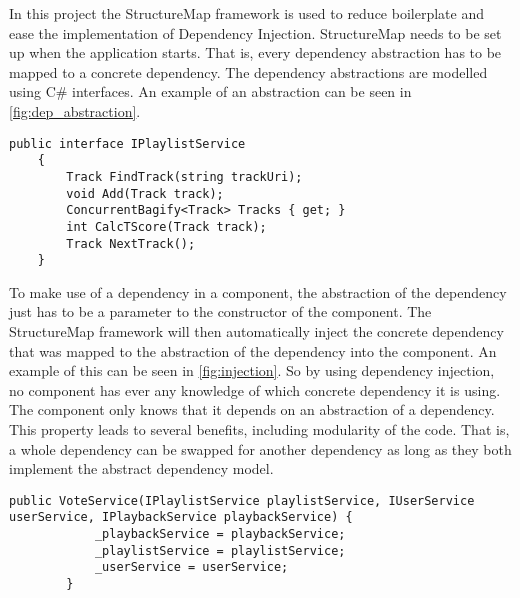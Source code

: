 In this project the StructureMap framework is used to reduce
boilerplate and ease the implementation of Dependency
Injection. StructureMap needs to be set up when the application
starts. That is, every dependency abstraction has to be mapped to a
concrete dependency. The dependency abstractions are modelled using
C\# interfaces. An example of an abstraction can be seen in \cref{fig:dep_abstraction}.

\begin{lstlisting}[caption = {Abstraction of a dependency abstraction
    using C\# interfaces. A concrete dependency has to implement the
    methods described in the abstraction.}, label={fig:dep_abstraction}]
public interface IPlaylistService
    {
        Track FindTrack(string trackUri);
        void Add(Track track);
        ConcurrentBagify<Track> Tracks { get; }
        int CalcTScore(Track track);
        Track NextTrack();
    }
\end{lstlisting}

To make use of a dependency in a component, the abstraction of the
dependency just has to be a parameter to the constructor of the
component. The StructureMap framework will then automatically inject
the concrete dependency that was mapped to the abstraction of the
dependency into the component. An example of this can be seen in
\cref{fig:injection}. So by using dependency injection, no component
has ever any knowledge of which concrete dependency it is using. The
component only knows that it depends on an abstraction of a
dependency. This property leads to several benefits, including
modularity of the code. That is, a whole dependency can be swapped for
another dependency as long as they both implement the abstract
dependency model.

\begin{lstlisting}[caption = {Dependency Injection through class
    constructors. IPlaylistService, IUserService and IPlaybackService
    are all abstractions of dependencies.}, label={fig:injection}]
public VoteService(IPlaylistService playlistService, IUserService userService, IPlaybackService playbackService) {
            _playbackService = playbackService;
            _playlistService = playlistService;
            _userService = userService;
        }
\end{lstlisting}
